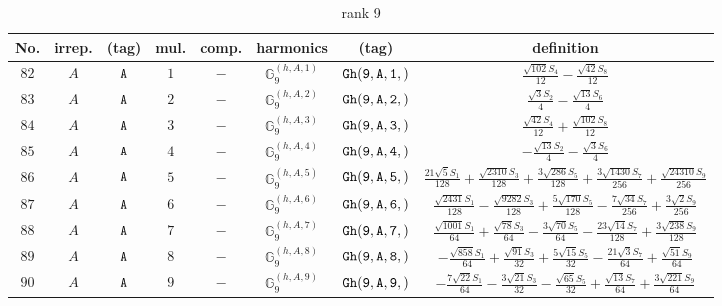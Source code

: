 \documentclass[fleqn,8pt]{jsarticle}
\begin{document}
\begin{table}[ht!]
\begin{center}
\caption{rank 9}
\renewcommand{\arraystretch}{1.3}
\begin{tabular}{cccccccc} \hline \hline
No. & irrep. & (tag) & mul. & comp. & harmonics & (tag) & definition \\ \hline
$ 82 $ & $ A $ & $ {\tt A} $ & $ 1 $ & $ - $ & $ \mathbb{G}_{9}^{(h,A,1)} $ & $ {\tt Gh(9,A,1,)} $ & $ \frac{\sqrt{102} S_{4}}{12} - \frac{\sqrt{42} S_{8}}{12} $ \\
$ 83 $ & $ A $ & $ {\tt A} $ & $ 2 $ & $ - $ & $ \mathbb{G}_{9}^{(h,A,2)} $ & $ {\tt Gh(9,A,2,)} $ & $ \frac{\sqrt{3} S_{2}}{4} - \frac{\sqrt{13} S_{6}}{4} $ \\
$ 84 $ & $ A $ & $ {\tt A} $ & $ 3 $ & $ - $ & $ \mathbb{G}_{9}^{(h,A,3)} $ & $ {\tt Gh(9,A,3,)} $ & $ \frac{\sqrt{42} S_{4}}{12} + \frac{\sqrt{102} S_{8}}{12} $ \\
$ 85 $ & $ A $ & $ {\tt A} $ & $ 4 $ & $ - $ & $ \mathbb{G}_{9}^{(h,A,4)} $ & $ {\tt Gh(9,A,4,)} $ & $ - \frac{\sqrt{13} S_{2}}{4} - \frac{\sqrt{3} S_{6}}{4} $ \\
$ 86 $ & $ A $ & $ {\tt A} $ & $ 5 $ & $ - $ & $ \mathbb{G}_{9}^{(h,A,5)} $ & $ {\tt Gh(9,A,5,)} $ & $ \frac{21 \sqrt{5} S_{1}}{128} + \frac{\sqrt{2310} S_{3}}{128} + \frac{3 \sqrt{286} S_{5}}{128} + \frac{3 \sqrt{1430} S_{7}}{256} + \frac{\sqrt{24310} S_{9}}{256} $ \\
$ 87 $ & $ A $ & $ {\tt A} $ & $ 6 $ & $ - $ & $ \mathbb{G}_{9}^{(h,A,6)} $ & $ {\tt Gh(9,A,6,)} $ & $ \frac{\sqrt{2431} S_{1}}{128} - \frac{\sqrt{9282} S_{3}}{128} + \frac{5 \sqrt{170} S_{5}}{128} - \frac{7 \sqrt{34} S_{7}}{256} + \frac{3 \sqrt{2} S_{9}}{256} $ \\
$ 88 $ & $ A $ & $ {\tt A} $ & $ 7 $ & $ - $ & $ \mathbb{G}_{9}^{(h,A,7)} $ & $ {\tt Gh(9,A,7,)} $ & $ \frac{\sqrt{1001} S_{1}}{64} + \frac{\sqrt{78} S_{3}}{64} - \frac{3 \sqrt{70} S_{5}}{64} - \frac{23 \sqrt{14} S_{7}}{128} + \frac{3 \sqrt{238} S_{9}}{128} $ \\
$ 89 $ & $ A $ & $ {\tt A} $ & $ 8 $ & $ - $ & $ \mathbb{G}_{9}^{(h,A,8)} $ & $ {\tt Gh(9,A,8,)} $ & $ - \frac{\sqrt{858} S_{1}}{64} + \frac{\sqrt{91} S_{3}}{32} + \frac{5 \sqrt{15} S_{5}}{32} - \frac{21 \sqrt{3} S_{7}}{64} + \frac{\sqrt{51} S_{9}}{64} $ \\
$ 90 $ & $ A $ & $ {\tt A} $ & $ 9 $ & $ - $ & $ \mathbb{G}_{9}^{(h,A,9)} $ & $ {\tt Gh(9,A,9,)} $ & $ - \frac{7 \sqrt{22} S_{1}}{64} - \frac{3 \sqrt{21} S_{3}}{32} - \frac{\sqrt{65} S_{5}}{32} + \frac{\sqrt{13} S_{7}}{64} + \frac{3 \sqrt{221} S_{9}}{64} $ \\

\end{tabular}
\end{center}
\end{table}
\end{document}
